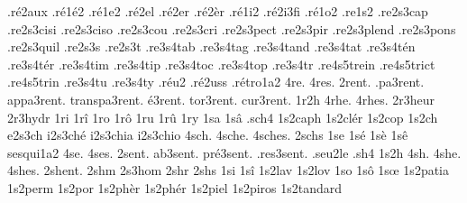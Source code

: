 {                    .ré2aux
                    .ré1é2
                    .ré1e2
                    .ré2el
                    .ré2er
                    .ré2èr
                    .ré1i2
                    .ré2i3fi
                    .ré1o2
                    .re1s2
                    .re2s3cap
                    .re2s3cisi %
                    .re2s3ciso %
                    .re2s3cou
                    .re2s3cri
                    .re2s3pect
                    .re2s3pir
                    .re2s3plend
                    .re2s3pons
                    .re2s3quil
                    .re2s3s
                    .re2s3t
                    .re3s4tab
                    .re3s4tag
                    .re3s4tand
                    .re3s4tat
                    .re3s4tén
                    .re3s4tér
                    .re3s4tim
                    .re3s4tip
                    .re3s4toc
                    .re3s4top
                    .re3s4tr
                    .re4s5trein
                    .re4s5trict
                    .re4s5trin
                    .re3s4tu
                    .re3s4ty
                    .réu2 %
                    .ré2uss
                    .rétro1a2
4re.
4res.
       2rent. %
    .pa3rent.
   appa3rent.
transpa3rent.
    é3rent.
    tor3rent.
    cur3rent.
%
1r2h
4rhe.
4rhes.
                    2r3heur
                    2r3hydr
1ri
1rî
1ro
1rô
1ru
1rû
1ry
1sa
1sâ
.sch4
                    1s2caph
                    1s2clér
                    1s2cop
 1s2ch
e2s3ch
i2s3ché
i2s3chia
i2s3chio
4sch.
4sche.
4sches.
2schs
1se
1sé
1sè
1sê
                    sesqui1a2
4se.
4ses.
    2sent. %
  ab3sent.
 pré3sent.
.res3sent.
%
.seu2le %
.sh4
1s2h
4sh.
4she.
4shes.
2shent. %
2shm
                    2s3hom
2shr
2shs
1si
1sî
                    1s2lav
                    1s2lov
1so
1sô
1sœ
                    1s2patia
                    1s2perm
                    1s2por
                    1s2phèr
                    1s2phér
                    1s2piel
                    1s2piros
                    1s2tandard
}
